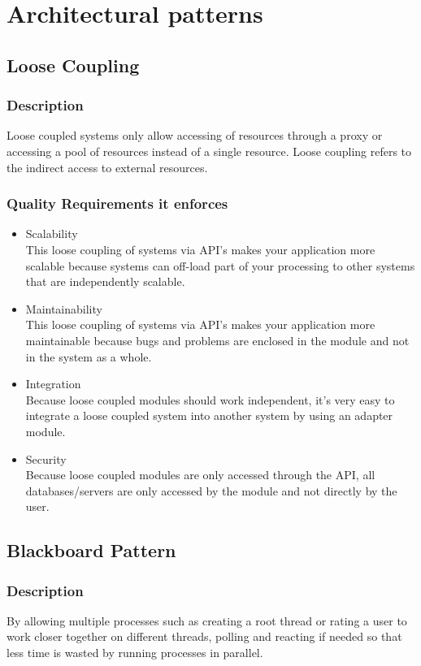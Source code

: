 
\section{Architectural patterns}
	\subsection{Loose Coupling}
		\subsubsection{Description}
		Loose coupled systems only allow accessing of resources through a proxy or accessing a pool of resources instead of a single resource. Loose coupling refers to the indirect access to external resources. 
		\subsubsection{Quality Requirements it enforces}
		\begin{itemize}
			\item Scalability \\
			This loose coupling of systems via API's makes your application more scalable because systems can off-load part of your processing to other systems that are independently scalable. 
			\item Maintainability \\
			This loose coupling of systems via API's makes your application more maintainable because bugs and problems are enclosed in the module and not in the system as a whole. 
			\item Integration \\
			Because loose coupled modules should work independent, it's very easy to integrate a loose coupled system into another system by using an adapter module. 
			\item Security \\
			Because loose coupled modules are only accessed through the API, all databases/servers are only accessed by the module and not directly by the user.
		\end{itemize}	
			
	\subsection{Blackboard Pattern}
		\subsubsection{Description}
 By allowing multiple processes such as creating a root thread or rating a user to work closer together on different threads, polling and reacting if needed so that less time is wasted by running processes in parallel.

